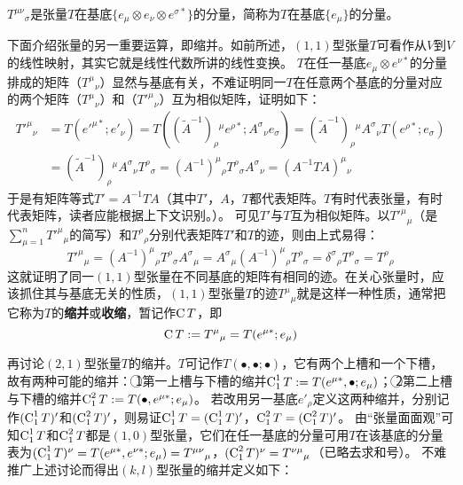 \begin{note}
$T^{\mu\nu}{}_\sigma$是张量$T$在基底$\{e_\mu \otimes e_\nu \otimes e^{\sigma*}\}$的分量，简称为$T$在基底$\{e_\mu\}$的分量。
\end{note}

下面介绍张量的另一重要运算，即缩并。如前所述，$(1, 1)$型张量$T$可看作从$V$到$V$的线性映射，其实它就是线性代数所讲的线性变换。
$T$在任一基底${e_\mu \otimes e^{\nu*}}$的分量排成的矩阵（$T^\mu{}_\nu$）显然与基底有关，不难证明同一$T$在任意两个基底的分量对应的两个矩阵（$T^\mu{}_\nu$）和（$T'^\mu{}_\nu$）互为相似矩阵，证明如下：
$$\begin{aligned}
T'^\mu{}_\nu & = T(e'^{\mu*}; e'_\nu) = T((\tilde{A}^{-1})_\rho{}^\mu e^{\rho*};A^\sigma{}_\nu e_\sigma) = (\tilde{A}^{-1})_\rho{}^\mu A^\sigma{}_\nu T(e^{\rho*}; e_\sigma) \\
& = (\tilde{A}^{-1})_\rho{}^\mu A^\sigma{}_\nu T^\rho{}_\sigma = (A^{-1})^\mu{}_\rho T^\rho{}_\sigma A^\sigma{}_\nu = (A^{-1}TA)^\mu{}_\nu
\end{aligned}$$
于是有矩阵等式$T' = A^{-1}TA$（其中$T'$，$A$，$T$都代表矩阵。$T$有时代表张量，有时代表矩阵，读者应能根据上下文识别。）。
可见$T'$与$T$互为相似矩阵。以$T'^\mu{}_\mu$（是$\sum_{\mu = 1}^n T'^\mu{}_\mu$的简写）和$T^\rho{}_\rho$分别代表矩阵$T'$和$T$的迹，则由上式易得：
$$T'^\mu{}_\mu = (A^{-1})^\mu{}_\rho T^\rho{}_\sigma A^\sigma{}_\mu = A^\sigma{}_\mu(A^{-1})^\mu{}_\rho T^\rho{}_\sigma = \delta^\sigma{}_\rho T^\rho{}_\sigma = T^\rho{}_\rho$$
这就证明了同一$(1, 1)$型张量在不同基底的矩阵有相同的迹。在关心张量时，应该抓住其与基底无关的性质，$(1, 1)$型张量$T$的迹$T^\mu{}_\mu$就是这样一种性质，通常把它称为$T$的\textbf{缩并}或\textbf{收缩}，暂记作$\operatorname{C} T$，即
$$\operatorname{C} T := T^\mu{}_\mu = T(e^{\mu*}; e_\mu)$$

再讨论$(2, 1)$型张量$T$的缩并。$T$可记作$T(\bullet, \bullet; \bullet)$，它有两个上槽和一个下槽，故有两种可能的缩并：
\textcircled{1}第一上槽与下槽的缩并$\operatorname{C}^1_1T := T(e^{\mu*}, \bullet; e_\mu)$；
\textcircled{2}第二上槽与下槽的缩并$\operatorname{C}^2_1T := T(\bullet, e^{\mu*}; e_\mu)$。
若改用另一基底${e'_\rho}$定义这两种缩并，分别记作$(\operatorname{C}^1_1T)'$和$(\operatorname{C}^2_1T)'$，则易证$\operatorname{C}^1_1T = (\operatorname{C}^1_1T)'$，$\operatorname{C}^2_1T = (\operatorname{C}^2_1T)'$。
由``张量面面观''可知$\operatorname{C}^1_1T$和$\operatorname{C}^2_1T$都是$(1, 0)$型张量，它们在任一基底的分量可用$T$在该基底的分量表为$(\operatorname{C}^1_1T)^\nu = T(e^{\mu*}, e^{\nu*}; e_\mu) = T^{\mu\nu}{}_\mu$，$(\operatorname{C}^2_1T)^\nu = T^{\nu\mu}{}_\mu$（已略去求和号）。
不难推广上述讨论而得出$(k, l)$型张量的缩并定义如下：

